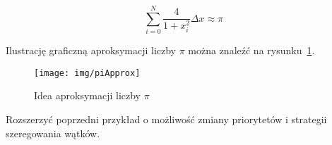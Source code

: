 \begin{myenumerate}
\begin{equation}\nonumber
\sum_{i=0}^N\frac{4}{1+x_i^2}\Delta x\approx\pi
\end{equation}

Ilustrację graficzną aproksymacji liczby $\pi$ można znaleźć na rysunku~\ref{fig:piApprox}.

\begin{figure}[!h]
\centering
\texttt{[image: img/piApprox]}
\caption{Idea aproksymacji liczby $\pi$}
\label{fig:piApprox}
\end{figure}



\item Rozszerzyć poprzedni przykład o możliwość zmiany priorytetów i strategii szeregowania wątków.
\end{myenumerate}


\cleardoublepage
